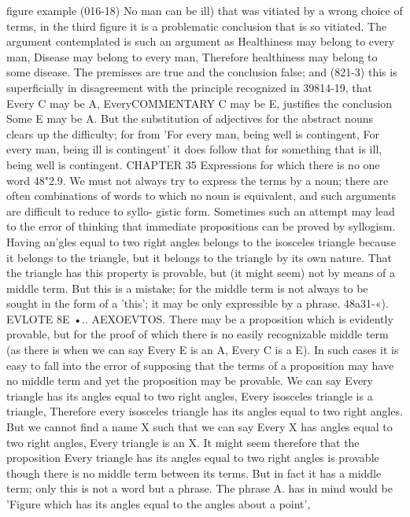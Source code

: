 {{{{{{{{{{{{{{{{{{{{{{{{{{figure example (016-18) No man can be ill) that was vitiated by
a wrong choice of terms, in the third figure it is a problematic
conclusion that is so vitiated. The argument contemplated is
such an argument as Healthiness may belong to every man,
Disease may belong to every man, Therefore healthiness may
belong to some disease. The premisses are true and the conclusion
false; and (821-3) this is superficially in disagreement with the
principle recognized in 39814-19, that Every C may be A, EveryCOMMENTARY
C may be E, justifies the conclusion Some E may be A. But the
substitution of adjectives for the abstract nouns clears up the
difficulty; for from 'For every man, being well is contingent, For
every man, being ill is contingent' it does follow that for something
that is ill, being well is contingent.
CHAPTER 35
Expressions for which there is no one word
48"2.9. We must not always try to express the terms by a
noun; there are often combinations of words to which no noun is
equivalent, and such arguments are difficult to reduce to syllo-
gistic form. Sometimes such an attempt may lead to the error of
thinking that immediate propositions can be proved by syllogism.
Having an'gles equal to two right angles belongs to the isosceles
triangle because it belongs to the triangle, but it belongs to the
triangle by its own nature. That the triangle has this property is
provable, but (it might seem) not by means of a middle term.
But this is a mistake; for the middle term is not always to be
sought in the form of a 'this'; it may be only expressible by a
phrase.
48a31-«). EVLOTE 8E •.. AEXOEVTOS. There may be a proposition
which is evidently provable, but for the proof of which there is
no easily recognizable middle term (as there is when we can say
Every E is an A, Every C is a E). In such cases it is easy to fall
into the error of supposing that the terms of a proposition may
have no middle term and yet the proposition may be provable.
We can say Every triangle has its angles equal to two right
angles, Every isosceles triangle is a triangle, Therefore every
isosceles triangle has its angles equal to two right angles. But
we cannot find a name X such that we can say Every X has angles
equal to two right angles, Every triangle is an X. It might seem
therefore that the proposition Every triangle has its angles equal
to two right angles is provable though there is no middle term
between its terms. But in fact it has a middle term; only this
is not a word but a phrase. The phrase A. has in mind would be
'Figure which has its angles equal to the angles about a point',
}}}}}}}}}}}}}}}}}}}}}}}}}}
